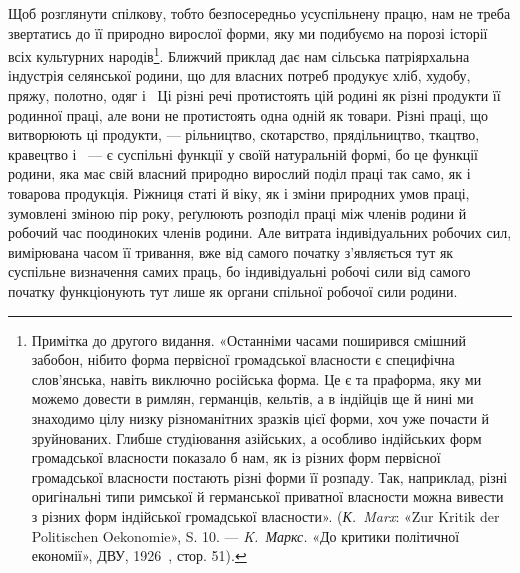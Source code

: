 Щоб розглянути спілкову, тобто безпосередньо усуспільнену
працю, нам не треба звертатись до її природно вирослої форми,
яку ми подибуємо на порозі історії всіх культурних народів\footnote{
Примітка до другого видання. «Останніми часами поширився
смішний забобон, нібито форма первісної громадської власности є специфічна
слов’янська, навіть виключно російська форма. Це є та праформа,
яку ми можемо довести в римлян, германців, кельтів, а в індійців ще й нині
ми знаходимо цілу низку різноманітних зразків цієї форми, хоч уже
почасти й зруйнованих. Глибше студіювання азійських, а особливо індійських
форм громадської власности показало б нам, як із різних форм
первісної громадської власности постають різні форми її розпаду. Так,
наприклад, різні оригінальні типи римської й германської приватної
власности можна вивести з різних форм індійської громадської власности».
(\emph{К.~Marx}: «Zur Kritik der Politischen Oekonomie», S. 10. — \emph{K.~Маркс.}
«До критики політичної економії», ДВУ, 1926~, стор. 51).
}.
Ближчий приклад дає нам сільська патріярхальна індустрія селянської
родини, що для власних потреб продукує хліб, худобу,
пряжу, полотно, одяг і~ Ці різні речі протистоять цій родині
як різні продукти її родинної праці, але вони не протистоять
одна одній як товари. Різні праці, що витворюють ці продукти, —
рільництво, скотарство, прядільництво, ткацтво, кравецтво і~ —
є суспільні функції у своїй натуральній формі, бо це функції
родини, яка має свій власний природно вирослий поділ праці
так само, як і товарова продукція. Ріжниця статі й віку, як і
зміни природних умов праці, зумовлені зміною пір року, реґулюють
розподіл праці між членів родини й робочий час поодиноких
членів родини. Але витрата індивідуальних робочих сил,
вимірювана часом її тривання, вже від самого початку з’являється
тут як суспільне визначення самих праць, бо індивідуальні робочі
сили від самого початку функціонують тут лише як органи спільної
робочої сили родини.

